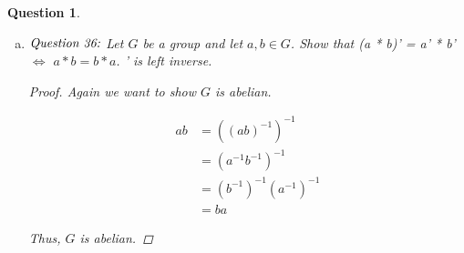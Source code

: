 \documentclass{article}
\newtheorem{ques}{Question}
\begin{document}
\begin{ques}
\begin{enumerate}[(a)]
\begin{proof}
			Thus, G is abelian.
			
		\end{proof}
	
		\item 
		$\emph{Question 36:}$ Let $G$ be a group and let $a,b \in G$. Show that (a * b)' = a' * b' $\iff$ $ a * b = b * a$. ' is left inverse.
		
		\begin{proof}
			Again we want to show $G$  is abelian.
			
			\begin{align*} 
			ab &= ((ab)^{-1})^{-1} \\
			&= (a^{-1}b^{-1})^{-1} \\
			&= (b^{-1})^{-1}(a^{-1})^{-1} \\
			&= ba
			\end{align*}
	
			Thus, $G$ is abelian.
	
		\end{proof}
	\end{enumerate}
\end{ques}
\end{document}
